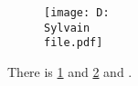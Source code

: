 \begin{figure}
\texttt{[image: D:\\Sylvain\\file.pdf]}
\label{A}
\end{figure}

\begin{figure}
\label{B}
\end{figure}

\begin{figure}
\label{C}
\end{figure}

There is \ref{A} and \cref{B} and .